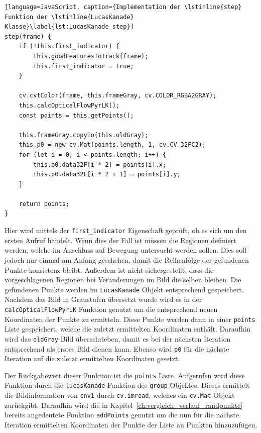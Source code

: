 \begin{lstlisting}[language=JavaScript, caption={Implementation der \lstinline{step} Funktion der \lstinline{LucasKanade} Klasse}\label{lst:LucasKanade_step}]
step(frame) {
    if (!this.first_indicator) {
        this.goodFeaturesToTrack(frame);
        this.first_indicator = true;
    }

    cv.cvtColor(frame, this.frameGray, cv.COLOR_RGBA2GRAY);
    this.calcOpticalFlowPyrLK();
    const points = this.getPoints();

    this.frameGray.copyTo(this.oldGray);
    this.p0 = new cv.Mat(points.length, 1, cv.CV_32FC2);
    for (let i = 0; i < points.length; i++) {
        this.p0.data32F[i * 2] = points[i].x;
        this.p0.data32F[i * 2 + 1] = points[i].y;
    }

    return points;
}
\end{lstlisting}

Hier wird mittels der \lstinline{first_indicator} Eigenschaft geprüft, ob es sich um den ersten Aufruf handelt.
Wenn dies der Fall ist müssen die Regionen definiert werden, welche im Anschluss auf Bewegung untersucht werden sollen.
Dies soll jedoch nur einmal am Anfang geschehen, damit die Reihenfolge der gefundenen Punkte konsistenz bleibt.
Außerdem ist nicht sichergestellt, dass die vorgeschlagenen Regionen bei Veränderungen im Bild die selben bleiben.
Die gefundenen Punkte werden im \lstinline{LucasKanade} Objekt entsprechend gespeichert.
Nachdem das Bild in Graustufen übersetzt wurde wird es in der \lstinline{calcOpticalFlowPyrLK} Funktion genutzt um die entsprechend neuen Koordinaten der Punkte zu ermitteln.
Diese Punkte werden dann in einer \lstinline{points} Liste gespeichert, welche die zuletzt ermittelten Koordinaten enthält.
Daraufhin wird das \lstinline{oldGray} Bild überschrieben, damit es bei der nächsten Iteration entsprechend als erstes Bild dienen kann.
Ebenso wird \lstinline{p0} für die nächste Iteration auf die zuletzt ermittelten Koordinaten gesetzt.

Der Rückgabewert dieser Funktion ist die \lstinline{points} Liste.
Aufgerufen wird diese Funktion durch die \lstinline{lucasKanade} Funktion des \lstinline{group} Objektes.
Dieses ermittelt die Bildinformation von \lstinline{cnv1} durch \lstinline{cv.imread}, welches ein \lstinline{cv.Mat} Objekt zurückgibt.
Daraufhin wird die in Kapitel~\ref{ch:vergleich_verlauf_randpunkte} bereits angedeutete Funktion \lstinline{addPoints} genutzt um die nun für die nächste Iteration ermittelten Koordinaten der Punkte der Liste an Punkten hinzuzufügen.

